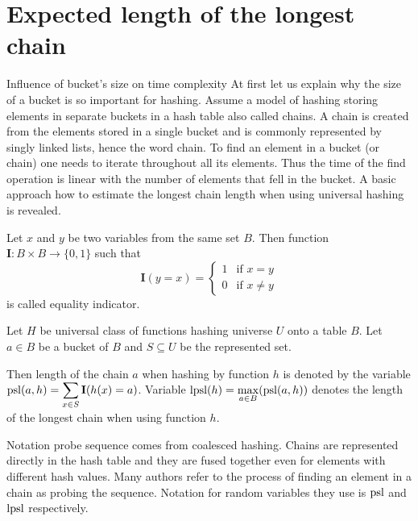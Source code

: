 \chapter{Expected length of the longest chain}

\begin{section}{Influence of bucket's size on time complexity}
At first let us explain why the size of a bucket is so important for hashing. Assume a model of hashing storing elements in separate buckets in a hash table also called chains. A chain is created from the elements stored in a single bucket and is commonly represented by singly linked lists, hence the word chain. To find an element in a bucket (or chain) one needs to iterate throughout all its elements. Thus the time of the find operation is linear with the number of elements that fell in the bucket. A basic approach how to estimate the longest chain length when using universal hashing is revealed.

\begin{definition}
Let $x$ and $y$ be two variables from the same set $B$. Then function $\mathbf{I}: B \times B \rightarrow \{0, 1\}$ such that
\[
 \mathbf{I}(y = x) =
  \begin{cases}
   1 & \text{if } x = y \\
   0 & \text{if } x \neq y
  \end{cases}
\]
is called equality indicator.
\end{definition}

\begin{definition}
Let $H$ be universal class of functions hashing universe $U$ onto a table $B$. Let $a \in B$ be a bucket of $B$ and $S \subseteq U$ be the represented set. 

Then length of the chain $a$ when hashing by function $h$ is denoted by the variable $\mathrm{psl}(a, h) = \displaystyle \sum_{x \in S} \mathbf{I}(h(x) = a)$. Variable $\mathrm{lpsl}(h) = \displaystyle \max_{a \in B} (\mathrm{psl}(a, h))$ denotes the length of the longest chain when using function $h$.
\end{definition}

Notation probe sequence comes from coalesced hashing. Chains are represented directly in the hash table and they are fused together even for elements with different hash values. Many authors refer to the process of finding an element in a chain as probing the sequence. Notation for random variables they use is $\mathrm{psl}$ and $\mathrm{lpsl}$ respectively. %


\end{section}
